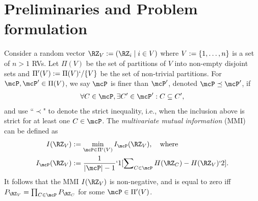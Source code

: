 \section{Preliminaries and Problem formulation}
\label{sec:problem}
Consider a random vector $\RZ_V:=(\RZ_i \mid i \in V)$ where $V:=\{1,\dots,n\}$ is a set of $n>1$
RVs. Let $\Pi(V)$ be the set of partitions of $V$ into non-empty disjoint sets and
$\Pi'(V):=\Pi(V)`/\{V\}$ be the set of non-trivial partitions.
For $\mcP, \mcP' \in \Pi(V)$, we say $\mcP$ is finer than $\mcP'$, denoted $\mcP \preceq \mcP'$, if
\begin{align}
	\label{eq:finer}
	\forall C \in \mcP,  \exists  C' \in \mcP' : C \subseteq C',
\end{align}
and use ``$\prec$" to denote the strict inequality, i.e., when the inclusion above is strict for at least
one $C \in \mcP$.
The \emph{multivariate mutual information} (MMI)~\cite{chan15mi} can be defined as
\begin{subequations}
	\label{eq:mmi}
	\begin{align}
		I(\RZ_V)&:=\min_{\mcP\in \Pi'(V)} I_{\mcP}(\RZ_V), \kern1em \text{where} \label{eq:I}\\
		I_{\mcP}(\RZ_V)&:= \frac{1}{|\mcP|-1}`1[\sum\nolimits_{C\in \mcP}H(\RZ_C) - H(\RZ_V) `2].\label{eq:IP}
	\end{align}
\end{subequations}
It follows that the MMI $I(\RZ_V)$ is non-negative, and is equal to zero iff $P_{\RZ_V}=\prod_{C\in \mcP}
P_{\RZ_C}$ for some $\mcP \in \Pi'(V)$.

